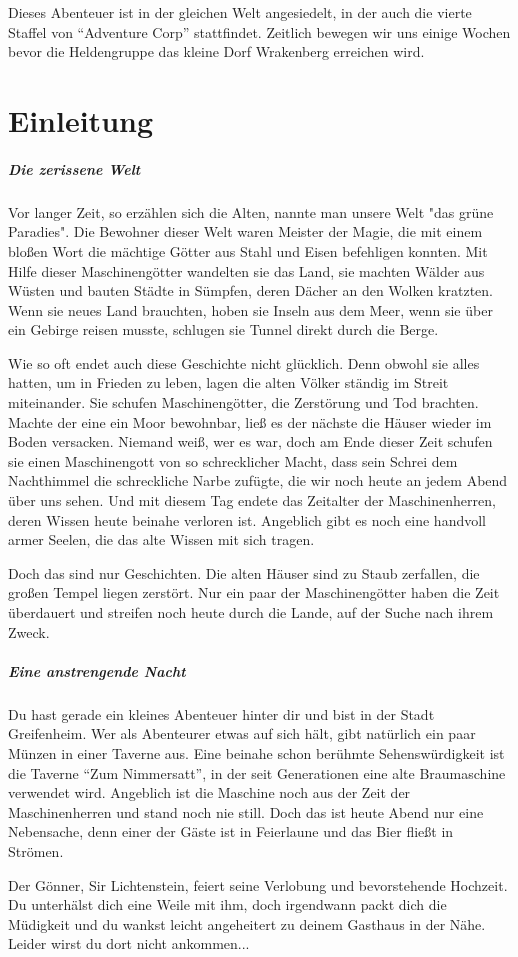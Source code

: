 Dieses Abenteuer ist in der gleichen Welt angesiedelt, in der auch die vierte Staffel von ``Adventure Corp'' stattfindet. Zeitlich bewegen wir uns einige Wochen bevor die Heldengruppe das kleine Dorf Wrakenberg erreichen wird.

\chapter{Einleitung}

\paragraph{Die zerissene Welt}

Vor langer Zeit, so erzählen sich die Alten, nannte man unsere Welt "das grüne Paradies". Die Bewohner dieser Welt waren Meister der Magie, die mit einem bloßen Wort die mächtige Götter aus Stahl und Eisen befehligen konnten. Mit Hilfe dieser Maschinengötter wandelten sie das Land, sie machten Wälder aus Wüsten und bauten Städte in Sümpfen, deren Dächer an den Wolken kratzten. Wenn sie neues Land brauchten, hoben sie Inseln aus dem Meer, wenn sie über ein Gebirge reisen musste, schlugen sie Tunnel direkt durch die Berge.

Wie so oft endet auch diese Geschichte nicht glücklich. Denn obwohl sie alles hatten, um in Frieden zu leben, lagen die alten Völker ständig im Streit miteinander. Sie schufen Maschinengötter, die Zerstörung und Tod brachten. Machte der eine ein Moor bewohnbar, ließ es der nächste die Häuser wieder im Boden versacken. Niemand weiß, wer es war, doch am Ende dieser Zeit schufen sie einen Maschinengott von so schrecklicher Macht, dass sein Schrei dem Nachthimmel die schreckliche Narbe zufügte, die wir noch heute an jedem Abend über uns sehen. Und mit diesem Tag endete das Zeitalter der Maschinenherren, deren Wissen heute beinahe verloren ist. Angeblich gibt es noch eine handvoll armer Seelen, die das alte Wissen mit sich tragen.

Doch das sind nur Geschichten. Die alten Häuser sind zu Staub zerfallen, die großen Tempel liegen zerstört. Nur ein paar der Maschinengötter haben die Zeit überdauert und streifen noch heute durch die Lande, auf der Suche nach ihrem Zweck.

\paragraph{Eine anstrengende Nacht}

Du hast gerade ein kleines Abenteuer hinter dir und bist in der Stadt Greifenheim. Wer als Abenteurer etwas auf sich hält, gibt natürlich ein paar Münzen in einer Taverne aus. Eine beinahe schon berühmte Sehenswürdigkeit ist die Taverne ``Zum Nimmersatt'', in der seit Generationen eine alte Braumaschine verwendet wird. Angeblich ist die Maschine noch aus der Zeit der Maschinenherren und stand noch nie still. Doch das ist heute Abend nur eine Nebensache, denn einer der Gäste ist in Feierlaune und das Bier fließt in Strömen.

Der Gönner, Sir Lichtenstein, feiert seine Verlobung und bevorstehende Hochzeit. Du unterhälst dich eine Weile mit ihm, doch irgendwann packt dich die Müdigkeit und du wankst leicht angeheitert zu deinem Gasthaus in der Nähe. Leider wirst du dort nicht ankommen...
